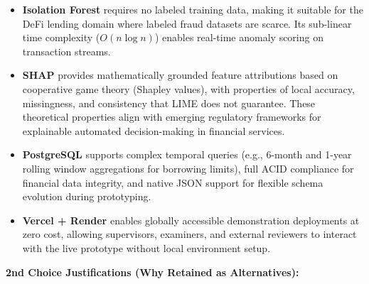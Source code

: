 \documentclass[12pt,a4paper]{report}
\begin{document}
\begin{itemize}[noitemsep]
\item \textbf{Isolation Forest} requires no labeled training data, making it suitable for the DeFi lending domain where labeled fraud datasets are scarce. Its sub-linear time complexity ($O(n \log n)$) enables real-time anomaly scoring on transaction streams.

\item \textbf{SHAP} provides mathematically grounded feature attributions based on cooperative game theory (Shapley values), with properties of local accuracy, missingness, and consistency that LIME does not guarantee. These theoretical properties align with emerging regulatory frameworks for explainable automated decision-making in financial services.

\item \textbf{PostgreSQL} supports complex temporal queries (e.g., 6-month and 1-year rolling window aggregations for borrowing limits), full ACID compliance for financial data integrity, and native JSON support for flexible schema evolution during prototyping.

\item \textbf{Vercel + Render} enables globally accessible demonstration deployments at zero cost, allowing supervisors, examiners, and external reviewers to interact with the live prototype without local environment setup.
\end{itemize}

\textbf{2nd Choice Justifications (Why Retained as Alternatives):}
\end{document}

